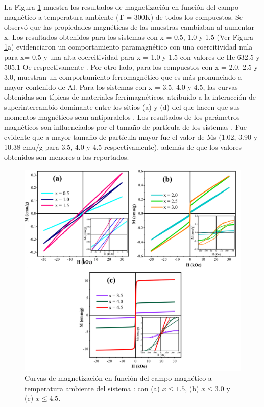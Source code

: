 La Figura \ref{fig:magneti} muestra los resultados de magnetización en función del campo
magnético a temperatura ambiente (T = 300K) de todos los compuestos. Se observó
que las propiedades magnéticas de las muestras cambiaban al aumentar x. Los
resultados obtenidos para los sistemas con x = 0.5, 1.0 y 1.5 (Ver Figura
\ref{fig:magneti}a)
evidenciaron un comportamiento paramagnético con una coercitividad nula para x=
0.5
y una alta coercitividad para x = 1.0 y 1.5 con valores de Hc 632.5 y
505.1 Oe respectivamente \cite{musa2017structural}. Por otro lado, para los compuestos con x =
2.0,
2.5 y 3.0, muestran un comportamiento ferromagnético que es más pronunciado a
mayor contenido de Al. Para los sistemas con x = 3.5, 4.0 y 4.5, las curvas
obtenidas son típicas de materiales ferrimagnéticos, atribuido a la interacción
de superintercambio dominante entre los sitios (a) y (d) del  que hacen
que
sus momentos magnéticos sean antiparalelos \cite{yamagishi2005ferrimagnetic}. Los resultados de los
parámetros magnéticos son influenciados por el tamaño de partícula de los
sistemas
\cite{tan2008room}. Fue evidente que a mayor tamaño de partícula mayor fue el valor de Ms
(1.02, 3.90 y 10.38 emu/g para 3.5, 4.0 y 4.5 respectivamente), además de que
los valores obtenidos son menores a los reportados.\\

\begin{figure}[h]
    \centering%

    \includegraphics[width=\textwidth]{Kap6/MH.png}%
    \caption{Curvas de magnetización en función del campo magnético a
        temperatura
        ambiente del sistema :  con (a) $x \leq 1.5$, (b) $x \leq 3.0$ y (c)  $x \leq 4.5$. }\label{fig:magneti}
\end{figure}

